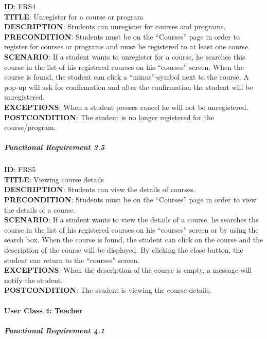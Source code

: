 \documentclass[9pt]{article}
\begin{document}
\textbf{ID}: FRS4\\\textbf{TITLE}: Unregister for a course or
program\\\textbf{DESCRIPTION}: Students can unregister for courses and
programs.\\\textbf{PRECONDITION}: Students must be on the ``Courses''
page in order to register for courses or programs and must be registered
to at least one course.\\\textbf{SCENARIO}: If a student wants to
unregister for a course, he searches this course in the list of his
registered courses on his ``courses'' screen. When the course is found,
the student can click a ``minus''-symbol next to the course. A pop-up
will ask for confirmation and after the confirmation the student will be
unregistered.\\\textbf{EXCEPTIONS}: When a student presses cancel he
will not be unregistered.\\\textbf{POSTCONDITION}: The student is no
longer registered for the course/program.

\subparagraph{Functional Requirement
3.5}\label{functional-requirement-3.5}

\textbf{ID}: FRS5\\\textbf{TITLE}: Viewing course
details\\\textbf{DESCRIPTION}: Students can view the details of
courses.\\\textbf{PRECONDITION}: Students must be on the ``Courses''
page in order to view the details of a course.\\\textbf{SCENARIO}: If a
student wants to view the details of a course, he searches the course in
the list of his registered courses on his ``courses'' screen or by using
the search box. When the course is found, the student can click on the
course and the description of the course will be displayed. By clicking
the close button, the student can return to the ``courses''
screen.\\\textbf{EXCEPTIONS}: When the description of the course is
empty, a message will notify the student.\\\textbf{POSTCONDITION}: The
student is viewing the course details.

\paragraph{User Class 4: Teacher}\label{user-class-4-teacher}

\subparagraph{Functional Requirement
4.1}\label{functional-requirement-4.1}
\end{document}
